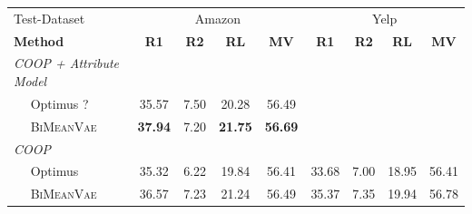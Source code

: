 \begin{table}[!h]
  
    \centering
    \begin{tabular}{@{}lcccc|cccc@{}}
    \toprule
             Test-Dataset                  & \multicolumn{4}{c}{Amazon} & \multicolumn{4}{c}{Yelp} \\ 
    \textbf{Method} & \textbf{R1} & \textbf{R2} & \textbf{RL} & \textbf{MV} & \textbf{R1} & \textbf{R2} & \textbf{RL} & \textbf{MV}\\ \midrule
    
    \textit{COOP + Attribute Model}        &         &         &        &        &        &   & &     \\
    $\quad$ Optimus   ?         &   35.57   & 7.50  &  20.28 & 56.49 &     &         &   &    \\ 
    $\quad$ \textsc{BiMeanVae}   &   \textbf{37.94}  &   7.20    &  \textbf{21.75} & \textbf{56.69} &     &      &   &    \\ \midrule
    


    \textit{COOP}              &         &         &        &        &        & &   &    \\ %
    $\quad$ Optimus           & 35.32 &6.22 &19.84  & 56.41&  33.68& 7.00 &18.95 & 56.41\\ 
    $\quad$ \textsc{BiMeanVae}  & 36.57 &7.23 &21.24 & 56.49 & 35.37& 7.35 &19.94 & 56.78\\ \midrule
    

    

\end{tabular}
\end{table}
